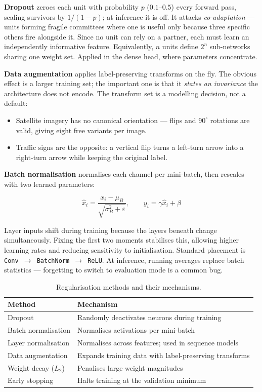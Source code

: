\documentclass[10pt,a4paper]{article}
\begin{document}
\textbf{Dropout} zeroes each unit with probability $p$ ($0.1$--$0.5$) every
forward pass, scaling survivors by $1/(1-p)$; at inference it is off. It
attacks \emph{co-adaptation} --- units forming fragile committees where one is
useful only because three specific others fire alongside it. Since no unit can
rely on a partner, each must learn an independently informative feature.
Equivalently, $n$ units define $2^n$ sub-networks sharing one weight set.
Applied in the dense head, where parameters concentrate.

\textbf{Data augmentation} applies label-preserving transforms on the fly. The
obvious effect is a larger training set; the important one is that it
\emph{states an invariance} the architecture does not encode. The transform set
is a modelling decision, not a default:

\begin{itemize}
  \item Satellite imagery has no canonical orientation --- flips and $90^\circ$
  rotations are valid, giving eight free variants per image.
  \item Traffic signs are the opposite: a vertical flip turns a left-turn arrow
  into a right-turn arrow while keeping the original label.
\end{itemize}

\textbf{Batch normalisation} normalises each channel per mini-batch, then
rescales with two learned parameters:

\begin{equation}
\hat{x}_i = \frac{x_i - \mu_B}{\sqrt{\sigma_B^2 + \varepsilon}},
\qquad y_i = \gamma \hat{x}_i + \beta
\end{equation}

Layer inputs shift during training because the layers beneath change
simultaneously. Fixing the first two moments stabilises this, allowing higher
learning rates and reducing sensitivity to initialisation. Standard placement
is \texttt{Conv $\to$ BatchNorm $\to$ ReLU}. At inference, running averages
replace batch statistics --- forgetting to switch to evaluation mode is a
common bug.

\begin{table}[tbp]
\centering
\caption{Regularisation methods and their mechanisms.}
\label{tab:reg}
\small
\begin{tabular}{ll}
\toprule
Method & Mechanism \\
\midrule
Dropout              & Randomly deactivates neurons during training \\
Batch normalisation  & Normalises activations per mini-batch \\
Layer normalisation  & Normalises across features; used in sequence models \\
Data augmentation    & Expands training data with label-preserving transforms \\
Weight decay ($L_2$) & Penalises large weight magnitudes \\
Early stopping       & Halts training at the validation minimum \\
\bottomrule
\end{tabular}
\end{table}
\end{document}
